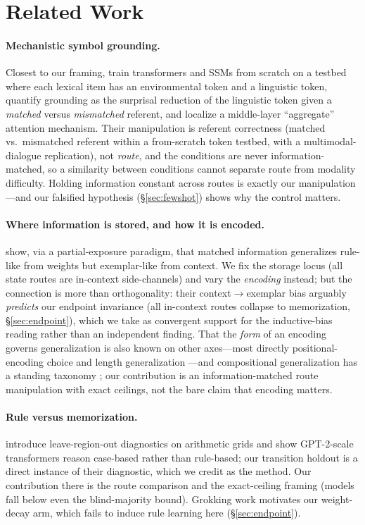 \documentclass[10pt]{article} %
\begin{document}
\section{Related Work}
\label{sec:related}
\paragraph{Mechanistic symbol grounding.} Closest to our framing, \citet{wu2025mechanistic} train
transformers and SSMs from scratch on a testbed where each lexical item has an environmental token
and a linguistic token, quantify grounding as the surprisal reduction of the linguistic token given
a \emph{matched} versus \emph{mismatched} referent, and localize a middle-layer ``aggregate''
attention mechanism. Their manipulation is referent correctness (matched vs.\ mismatched referent
within a from-scratch token testbed, with a multimodal-dialogue replication), not \emph{route}, and
the conditions are never information-matched, so a similarity between conditions cannot separate
route from modality difficulty. Holding information constant across routes is exactly our
manipulation---and our falsified hypothesis (\S\ref{sec:fewshot}) shows why the control matters.

\paragraph{Where information is stored, and how it is encoded.} \citet{chan2022transformers} show,
via a partial-exposure paradigm, that matched information generalizes rule-like from weights but
exemplar-like from context. We fix the storage locus (all state routes are in-context side-channels)
and vary the \emph{encoding} instead; but the connection is more than orthogonality: their
context$\to$exemplar bias arguably \emph{predicts} our endpoint invariance (all in-context routes
collapse to memorization, \S\ref{sec:endpoint}), which we take as convergent support for the
inductive-bias reading rather than an independent finding. That the \emph{form} of an encoding
governs generalization is also known on other axes---most directly positional-encoding choice and
length generalization \citep{kazemnejad2023impact}---and compositional generalization has a
standing taxonomy \citep{hupkes2020compositionality}; our contribution is an information-matched
route manipulation with exact ceilings, not the bare claim that encoding matters.

\paragraph{Rule versus memorization.} \citet{hu2024case} introduce leave-region-out diagnostics on
arithmetic grids and show GPT-2-scale transformers reason case-based rather than rule-based; our
transition holdout is a direct instance of their diagnostic, which we credit as the method. Our
contribution there is the route comparison and the exact-ceiling framing (models fall below even
the blind-majority bound). Grokking work \citep{power2022grokking,nanda2023progress,zhong2023clock}
motivates our weight-decay arm, which fails to induce rule learning here (\S\ref{sec:endpoint}).
\end{document}
